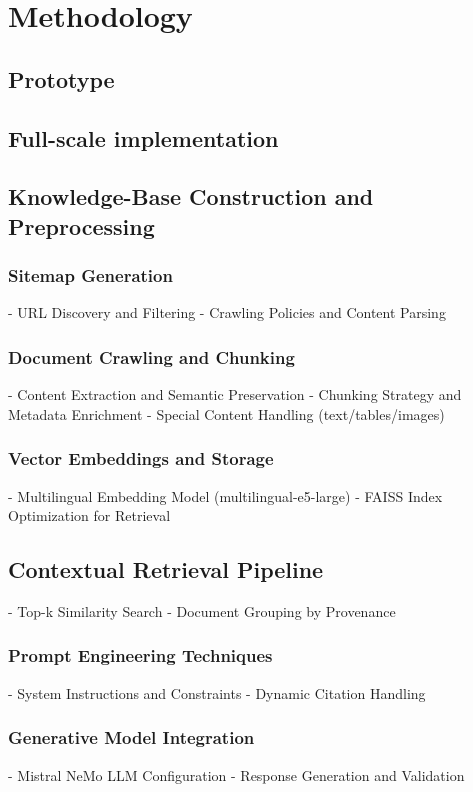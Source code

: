 \chapter{Methodology}
\label{chap:methodology}
\begin{spacing}{1.5}

\section{Prototype}

\section{Full-scale implementation}

\section{Knowledge-Base Construction and Preprocessing}
\subsection{Sitemap Generation}
      - URL Discovery and Filtering
      - Crawling Policies and Content Parsing
\subsection{Document Crawling and Chunking}
      - Content Extraction and Semantic Preservation
      - Chunking Strategy and Metadata Enrichment
      - Special Content Handling (text/tables/images)
\subsection{Vector Embeddings and Storage}
      - Multilingual Embedding Model (multilingual-e5-large)
      - FAISS Index Optimization for Retrieval

\section{Contextual Retrieval Pipeline}
      - Top-k Similarity Search
      - Document Grouping by Provenance
\subsection{Prompt Engineering Techniques}
      - System Instructions and Constraints
      - Dynamic Citation Handling
\subsection{Generative Model Integration}
      - Mistral NeMo LLM Configuration
      - Response Generation and Validation


\end{spacing}
